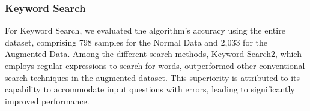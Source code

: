 \documentclass[12pt,oneside,openright,a4paper]{cpe-english-project}
\begin{document}
      \subsubsection{Keyword Search}
        \begin{table}[H]
          \centering
          \caption{Operation Classification with Added Normal and Augmented Experiment Result (Keyword Search)}\label{tab:Keyword_Search}
        \end{table}
        \qquad For Keyword Search, we evaluated the algorithm’s accuracy using the entire dataset, comprising 798 samples for the Normal Data and 2,033 for the Augmented Data. Among the different search methods, Keyword Search2, which employs regular expressions to search for words, outperformed other conventional search techniques in the augmented dataset. This superiority is attributed to its capability to accommodate input questions with errors, leading to significantly improved performance. \par
\end{document}
